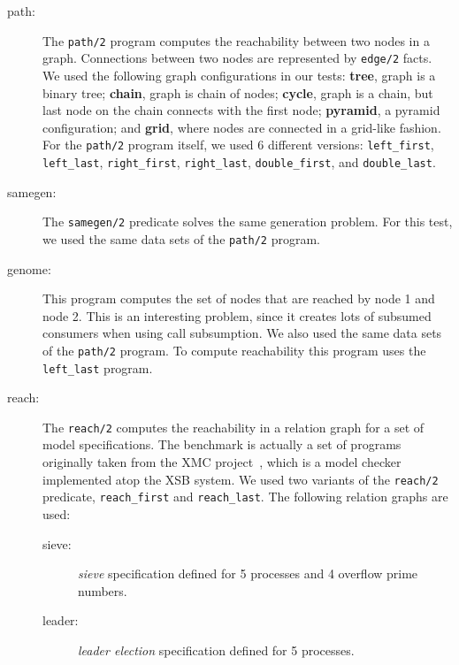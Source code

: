 \begin{description}
   
   \item[path:] The \texttt{path/2} program computes the reachability between two nodes in a graph.
   Connections between two nodes are represented by \texttt{edge/2} facts.
   We used the following graph configurations in our tests: \textbf{tree}, graph is a
   binary tree; \textbf{chain}, graph is chain of nodes; \textbf{cycle}, graph is a chain, but
   last node on the chain connects with the first node; \textbf{pyramid}, a pyramid configuration;
   and \textbf{grid}, where nodes are connected in a grid-like fashion.
   For the \texttt{path/2} program itself, we used 6 different versions: \texttt{left\_first},
   \texttt{left\_last}, \texttt{right\_first}, \texttt{right\_last},
   \texttt{double\_first}, and \texttt{double\_last}.
    
   \item[samegen:] The \texttt{samegen/2} predicate solves the same generation problem.
   For this test, we used the same data sets of the \texttt{path/2} program.
   
   \item[genome:] This program computes the set of nodes that are reached by node 1 and node 2.
   This is an interesting problem, since it creates lots of subsumed consumers when using
   call subsumption. We also used the same data sets of the \texttt{path/2} program.
   To compute reachability this program uses the \texttt{left\_last} program.
   
   \item[reach:] The \texttt{reach/2} computes the reachability in a relation graph for a set of
   model specifications. The benchmark is actually a set of programs originally taken from the
   XMC project~\cite{system-xmc,RamakrishnanCR-00}, which is a model checker implemented
   atop the XSB system. We used two variants of the \texttt{reach/2} predicate,
   \texttt{reach\_first} and \texttt{reach\_last}.
   The following relation graphs are used:
   
      \begin{description}
         
         \item[sieve:] \emph{sieve} specification defined for 5 processes and 4 overflow prime numbers.
         
         \item[leader:] \emph{leader election} specification defined for 5 processes.
         

\end{description}
\end{description}
